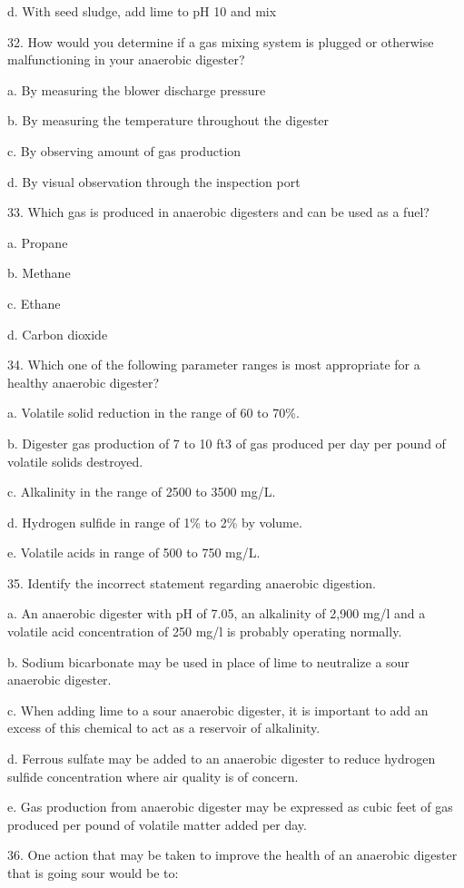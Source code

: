 \documentclass{article}
\begin{document}
d. With seed sludge, add lime to pH 10 and mix 


32. How would you determine if a gas mixing system is plugged or otherwise malfunctioning in your anaerobic digester? 

a. By measuring the blower discharge pressure 

b. By measuring the temperature throughout the digester 

c. By observing amount of gas production 

d. By visual observation through the inspection port 


33. Which gas is produced in anaerobic digesters and can be used as a fuel? 

a. Propane 

b. Methane 

c. Ethane 

d. Carbon dioxide 


34. Which one of the following parameter ranges is most appropriate for a healthy anaerobic digester?

a. Volatile solid reduction in the range of 60 to 70\%. 

b. Digester gas production of 7 to 10 ft3 of gas produced per day per pound of volatile solids destroyed. 

c. Alkalinity in the range of 2500 to 3500 mg/L. 

d. Hydrogen sulfide in range of 1\% to 2\% by volume. 

e. Volatile acids in range of 500 to 750 mg/L. 


35. Identify the incorrect statement regarding anaerobic digestion.

a. An anaerobic digester with pH of 7.05, an alkalinity of 2,900 mg/l and a volatile acid concentration of 250 mg/l is probably operating normally. 

b. Sodium bicarbonate may be used in place of lime to neutralize a sour anaerobic digester. 

c. When adding lime to a sour anaerobic digester, it is important to add an excess of this chemical to act as a reservoir of alkalinity. 

d. Ferrous sulfate may be added to an anaerobic digester to reduce hydrogen sulfide concentration where air quality is of concern. 

e. Gas production from anaerobic digester may be expressed as cubic feet of gas produced per pound of volatile matter added per day. 


36. One action that may be taken to improve the health of an anaerobic digester that is going sour would be to:
\end{document}
